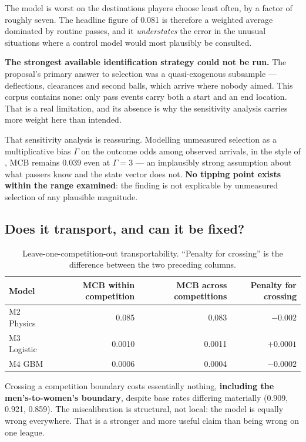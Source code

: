 \documentclass[11pt,a4paper]{article}
\begin{document}
The model is worst on the destinations players choose least often, by a factor of
roughly seven. The headline figure of 0.081 is therefore a weighted average
dominated by routine passes, and it \emph{understates} the error in the unusual
situations where a control model would most plausibly be consulted.

\textbf{The strongest available identification strategy could not be run.} The
proposal's primary answer to selection was a quasi-exogenous subsample ---
deflections, clearances and second balls, which arrive where nobody aimed. This
corpus contains none: only pass events carry both a start and an end location.
That is a real limitation, and its absence is why the sensitivity analysis
carries more weight here than intended.

That sensitivity analysis is reassuring. Modelling unmeasured selection as a
multiplicative bias $\Gamma$ on the outcome odds among observed arrivals, in the
style of \citet{rosenbaum1983propensity}, MCB remains 0.039 even at
$\Gamma = 3$ --- an implausibly strong assumption about what passers know and the
state vector does not. \textbf{No tipping point exists within the range
examined}: the finding is not explicable by unmeasured selection of any plausible
magnitude.

\subsection{Does it transport, and can it be fixed?}

\begin{table}[h]
\centering
\small
\caption{Leave-one-competition-out transportability. ``Penalty for crossing'' is
the difference between the two preceding columns.}
\label{tab:transport}
\begin{tabular}{lrrr}
\toprule
Model & MCB within competition & MCB across competitions & Penalty for crossing \\
\midrule
M2 Physics  & 0.085  & 0.083  & $\mathbf{-0.002}$ \\
M3 Logistic & 0.0010 & 0.0011 & $+0.0001$ \\
M4 GBM      & 0.0006 & 0.0004 & $-0.0002$ \\
\bottomrule
\end{tabular}
\end{table}

Crossing a competition boundary costs essentially nothing, \textbf{including the
men's-to-women's boundary}, despite base rates differing materially (0.909,
0.921, 0.859). The miscalibration is structural, not local: the model is equally
wrong everywhere. That is a stronger and more useful claim than being wrong on
one league.
\end{document}
